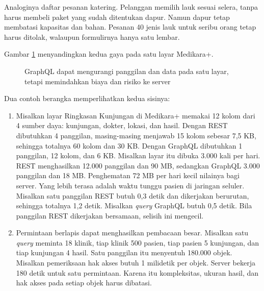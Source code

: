 Analoginya daftar pesanan katering. Pelanggan memilih lauk sesuai selera, tanpa harus membeli paket yang sudah ditentukan
dapur. Namun dapur tetap membatasi kapasitas dan bahan. Pesanan 40 jenis lauk untuk seribu orang tetap harus ditolak,
walaupun formulirnya hanya satu lembar.

Gambar \ref{fig:ch05-rest-graphql} menyandingkan kedua gaya pada satu layar Medikara+.

\begin{figure}[!htb]
  \centering
  
  \caption{GraphQL dapat mengurangi panggilan dan data pada satu layar, tetapi memindahkan biaya dan risiko ke server}
  \label{fig:ch05-rest-graphql}
\end{figure}

Dua contoh berangka memperlihatkan kedua sisinya:
\begin{enumerate}
  \item Misalkan layar Ringkasan Kunjungan di Medikara+ memakai 12 kolom dari 4 sumber daya: kunjungan, dokter, lokasi, dan
        hasil. Dengan REST dibutuhkan 4 panggilan, masing-masing menjawab 15 kolom sebesar 7,5 KB, sehingga totalnya 60
        kolom dan 30 KB. Dengan GraphQL dibutuhkan 1 panggilan, 12 kolom, dan 6 KB. Misalkan layar itu dibuka 3.000 kali
        per hari. REST menghasilkan 12.000 panggilan dan 90 MB, sedangkan GraphQL 3.000 panggilan dan 18 MB. Penghematan 72
        MB per hari kecil nilainya bagi server. Yang lebih terasa adalah waktu tunggu pasien di jaringan seluler. Misalkan satu
        panggilan REST butuh 0,3 detik dan dikerjakan berurutan, sehingga totalnya 1,2 detik. Misalkan \textit{query} GraphQL
        butuh 0,5 detik. Bila panggilan REST dikerjakan bersamaan, selisih ini mengecil.
  \item Permintaan berlapis dapat menghasilkan pembacaan besar. Misalkan satu \textit{query} meminta 18 klinik, tiap klinik
        500 pasien, tiap pasien 5 kunjungan, dan tiap kunjungan 4 hasil. Satu panggilan itu menyentuh 180.000 objek. Misalkan
        pemeriksaan hak akses butuh 1 milidetik per objek. Server bekerja 180 detik untuk satu permintaan. Karena itu
        kompleksitas, ukuran hasil, dan hak akses pada setiap objek harus dibatasi.
\end{enumerate}

